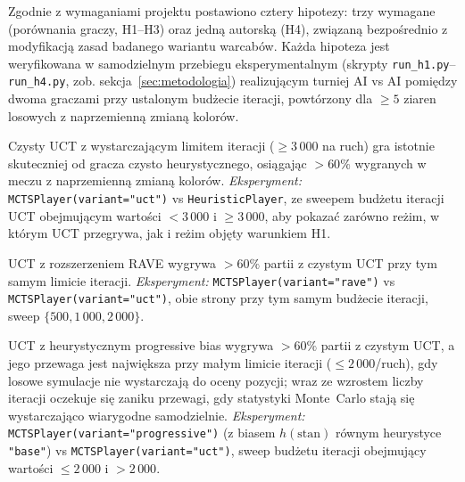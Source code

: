 \documentclass[11pt,a4paper]{article}
\begin{document}
Zgodnie z wymaganiami projektu postawiono cztery hipotezy: trzy wymagane
(porównania graczy, H1--H3) oraz jedną autorską (H4), związaną
bezpośrednio z modyfikacją zasad badanego wariantu warcabów. Każda
hipoteza jest weryfikowana w samodzielnym przebiegu eksperymentalnym
(skrypty \texttt{run\_h1.py}--\texttt{run\_h4.py}, zob.
sekcja~\ref{sec:metodologia}) realizującym turniej AI vs AI pomiędzy
dwoma graczami przy ustalonym budżecie iteracji, powtórzony dla $\geq 5$
ziaren losowych z naprzemienną zmianą kolorów.

\begin{description}[style=nextline,leftmargin=0pt]
    \item[H1 (UCT vs heurystyka).] Czysty UCT z wystarczającym limitem
        iteracji ($\geq 3\,000$ na ruch) gra istotnie skuteczniej od
        gracza czysto heurystycznego, osiągając $> 60\%$ wygranych w meczu
        z naprzemienną zmianą kolorów.  \emph{Eksperyment:}
        \texttt{MCTSPlayer(variant="uct")} vs \texttt{HeuristicPlayer}, ze
        sweepem budżetu iteracji UCT obejmującym wartości $<3\,000$ i
        $\geq 3\,000$, aby pokazać zarówno reżim, w którym UCT przegrywa,
        jak i reżim objęty warunkiem H1.

    \item[H2 (RAVE poprawia UCT).] UCT z rozszerzeniem RAVE wygrywa
        $> 60\%$ partii z czystym UCT przy tym samym limicie iteracji.
        \emph{Eksperyment:}
        \texttt{MCTSPlayer(variant="rave")} vs
        \texttt{MCTSPlayer(variant="uct")}, obie strony przy tym samym
        budżecie iteracji, sweep $\{500, 1\,000, 2\,000\}$.

    \item[H3 (Progressive bias poprawia UCT).] UCT z heurystycznym
        progressive bias wygrywa $> 60\%$ partii z czystym UCT, a jego
        przewaga jest największa przy małym limicie iteracji
        ($\leq 2\,000$/ruch), gdy losowe symulacje nie wystarczają do
        oceny pozycji; wraz ze wzrostem liczby iteracji oczekuje się
        zaniku przewagi, gdy statystyki Monte~Carlo stają się
        wystarczająco wiarygodne samodzielnie. \emph{Eksperyment:}
        \texttt{MCTSPlayer(variant="progressive")} (z biasem
        $h(\text{stan})$ równym heurystyce \texttt{"base"}) vs
        \texttt{MCTSPlayer(variant="uct")}, sweep budżetu iteracji
        obejmujący wartości $\leq 2\,000$ i $> 2\,000$.


\end{description}
\end{document}
